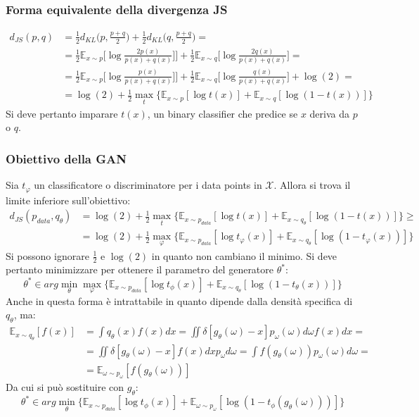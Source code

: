 \subsubsection{Forma equivalente della divergenza JS}
\begin{align*}
	d_{JS}(p,q) &= \frac{1}{2}d_{KL}\bigl(p, \frac{p+q}{2}\bigr) + \frac{1}{2}d_{KL}\bigl(q, \frac{p+q}{2}\bigr)=\\
	&=\frac{1}{2}\mathbb{E}_{x\sim p}\bigl[\log\frac{2p(x)}{p(x)+q(x)}]\bigr]+\frac{1}{2}\mathbb{E}_{x\sim q}\bigl[\log\frac{2q(x)}{p(x)+q(x)}\bigr]=\\
	&=\frac{1}{2}\mathbb{E}_{x\sim p}\bigl[\log\frac{p(x)}{p(x)+q(x)}]\bigr]+\frac{1}{2}\mathbb{E}_{x\sim q}\bigl[\log\frac{q(x)}{p(x)+q(x)}\bigr] + \log(2)=\\
	&=\log(2)+\frac{1}{2}\max\limits_t\{\mathbb{E}_{x\sim p}[\log t(x)]+\mathbb{E}_{x\sim q}[\log(1-t(x))]\}
\end{align*}
Si deve pertanto imparare $t(x)$, un binary classifier che predice se $x$ deriva da $p$ o $q$.

\subsubsection{Obiettivo della GAN}
Sia $t_\varphi$ un classificatore o discriminatore per i data points in $\mathcal{X}$.
Allora si trova il limite inferiore sull'obiettivo:
\begin{align*}
	d_{JS}(p_{data}, q_\theta) &= \log(2) + \frac{1}{2}\max\limits_t\{\mathbb{E}_{x\sim p_{data}}[\log t(x)] + \mathbb{E}_{x\sim q_\theta}[\log(1-t(x))]\}\ge\\
	&= \log(2) + \frac{1}{2}\max\limits_\varphi\{\mathbb{E}_{x\sim p_{data}}[\log t_\varphi(x)] + \mathbb{E}_{x\sim q_\theta}[\log(1-t_\varphi(x))]\}
\end{align*}
Si possono ignorare $\frac{1}{2}$ e $\log(2)$ in quanto non cambiano il minimo.
Si deve pertanto minimizzare per ottenere il parametro del generatore $\theta^*$:
$$\theta^*\in arg\min\limits_\theta\max\limits_\varphi\{\mathbb{E}_{x\sim p_{data}}[\log t_\phi(x)] + \mathbb{E}_{x\sim q_\theta}[\log(1-t_\theta(x))]\}$$
Anche in questa forma \`e intrattabile in quanto dipende dalla densit\`a specifica di $q_\theta$, ma:
\begin{align*}
	\mathbb{E}_{x\sim q_\theta}[f(x)] &= \int q_\theta(x)f(x)dx = \iint\delta[g_\theta(\omega)-x]p_\omega(\omega)d\omega f(x)dx=\\
	& = \iint\delta[g_\theta(\omega)-x]f(x)dxp_\omega d\omega = \int f(g_\theta(\omega))p_\omega(\omega)d\omega = \\
	&= \mathbb{E}_{\omega\sim p_\omega}[f(g_\theta(\omega))]
\end{align*}
Da cui si pu\`o sostituire con $g_\theta$:
$$\theta^*\in arg\min\limits_{\theta}\{\mathbb{E}_{x\sim p_{data}}[\log t_\phi(x)]+\mathbb{E}_{\omega\sim p_\omega}[\log(1-t_\phi(g_\theta(\omega)))]\}$$

